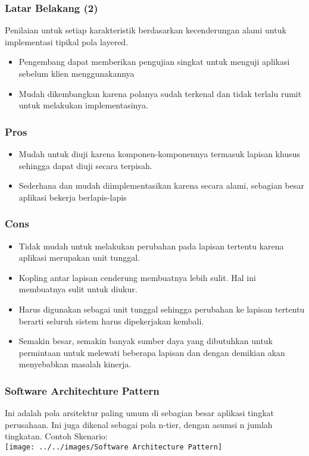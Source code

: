 \documentclass[aspectratio=169, table]{beamer}
\begin{document}
		\begin{frame}
		\frametitle{Latar Belakang (2)}
		Penilaian untuk setiap karakteristik berdasarkan kecenderungan alami untuk implementasi tipikal pola layered.
		\begin{itemize}

			\item Pengembang dapat memberikan pengujian singkat untuk menguji aplikasi sebelum klien menggunakannya
			\item Mudah dikembangkan karena polanya sudah terkenal dan tidak terlalu rumit untuk melakukan implementasinya.
		\end{itemize}
	\end{frame}


	\begin{frame}
		\frametitle{Pros}
		\begin{itemize}
			\item Mudah untuk diuji karena komponen-komponennya termasuk lapisan khusus sehingga dapat diuji secara terpisah.
			\item Sederhana dan mudah diimplementasikan karena secara alami, sebagian besar aplikasi bekerja berlapis-lapis
		\end{itemize}
	\end{frame}

	\begin{frame}
		\frametitle{Cons}
		\begin{itemize}
			\item Tidak mudah untuk melakukan perubahan pada lapisan tertentu karena aplikasi merupakan unit tunggal.
			\item Kopling antar lapisan cenderung membuatnya lebih sulit. Hal ini membuatnya sulit untuk diukur.
			\item Harus digunakan sebagai unit tunggal sehingga perubahan ke lapisan tertentu berarti seluruh sistem harus dipekerjakan kembali.
			\item Semakin besar, semakin banyak sumber daya yang dibutuhkan untuk permintaan untuk melewati beberapa lapisan dan dengan demikian akan menyebabkan masalah kinerja.
		\end{itemize}
	\end{frame}

	\begin{frame}
		\frametitle{Software Architechture Pattern}
		Ini adalah pola arsitektur paling umum di sebagian besar aplikasi tingkat perusahaan. Ini juga dikenal sebagai pola n-tier, dengan asumsi n jumlah tingkatan. Contoh Skenario: \\
		\texttt{[image: ../../images/Software Architecture Pattern]}
	\end{frame}
\end{document}
